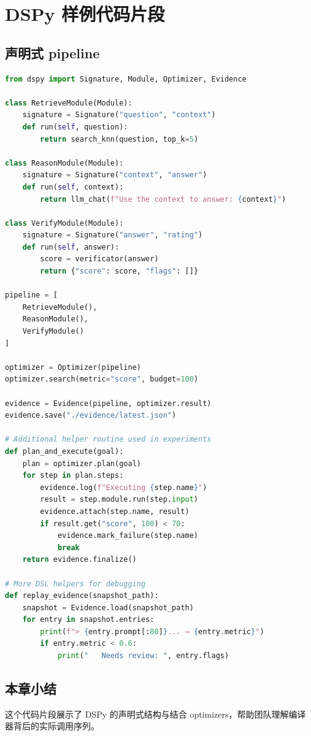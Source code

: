 \section{DSPy 样例代码片段}

\subsection{声明式 pipeline}

\begin{lstlisting}[language=Python]
from dspy import Signature, Module, Optimizer, Evidence

class RetrieveModule(Module):
    signature = Signature("question", "context")
    def run(self, question):
        return search_knn(question, top_k=5)

class ReasonModule(Module):
    signature = Signature("context", "answer")
    def run(self, context):
        return llm_chat(f"Use the context to answer: {context}")

class VerifyModule(Module):
    signature = Signature("answer", "rating")
    def run(self, answer):
        score = verificator(answer)
        return {"score": score, "flags": []}

pipeline = [
    RetrieveModule(),
    ReasonModule(),
    VerifyModule()
]

optimizer = Optimizer(pipeline)
optimizer.search(metric="score", budget=100)

evidence = Evidence(pipeline, optimizer.result)
evidence.save("./evidence/latest.json")

# Additional helper routine used in experiments
def plan_and_execute(goal):
    plan = optimizer.plan(goal)
    for step in plan.steps:
        evidence.log(f"Executing {step.name}")
        result = step.module.run(step.input)
        evidence.attach(step.name, result)
        if result.get("score", 100) < 70:
            evidence.mark_failure(step.name)
            break
    return evidence.finalize()

# More DSL helpers for debugging
def replay_evidence(snapshot_path):
    snapshot = Evidence.load(snapshot_path)
    for entry in snapshot.entries:
        print(f"> {entry.prompt[:80]}... → {entry.metric}")
        if entry.metric < 0.6:
            print("   Needs review: ", entry.flags)
\end{lstlisting}

\subsection{本章小结}

这个代码片段展示了 DSPy 的声明式结构与结合 optimizers，帮助团队理解编译器背后的实际调用序列。

